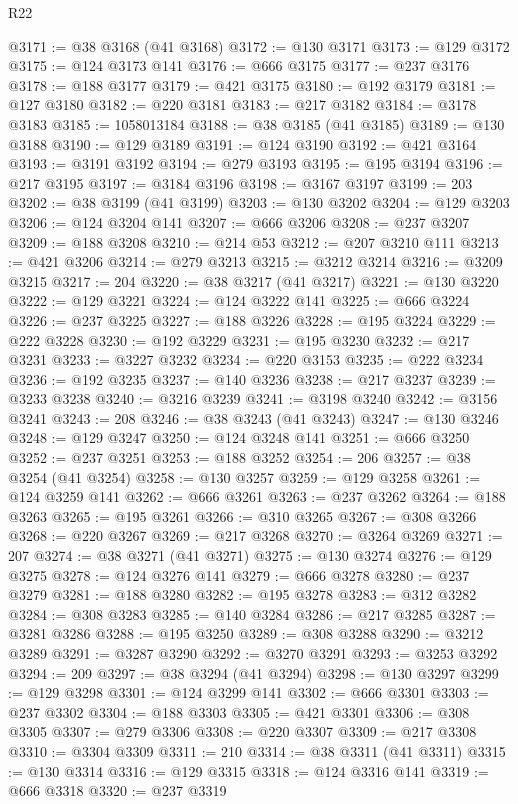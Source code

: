 \begin{lexlean}{R22}
\begin{coremodule}
@3171 := @38 @3168 (@41 @3168)
@3172 := @130 @3171
@3173 := @129 @3172
@3175 := @124 @3173 @141
@3176 := @666 @3175
@3177 := @237 @3176
@3178 := @188 @3177
@3179 := @421 @3175
@3180 := @192 @3179
@3181 := @127 @3180
@3182 := @220 @3181
@3183 := @217 @3182
@3184 := @3178 @3183
@3185 := 1058013184
@3188 := @38 @3185 (@41 @3185)
@3189 := @130 @3188
@3190 := @129 @3189
@3191 := @124 @3190
@3192 := @421 @3164
@3193 := @3191 @3192
@3194 := @279 @3193
@3195 := @195 @3194
@3196 := @217 @3195
@3197 := @3184 @3196
@3198 := @3167 @3197
@3199 := 203
@3202 := @38 @3199 (@41 @3199)
@3203 := @130 @3202
@3204 := @129 @3203
@3206 := @124 @3204 @141
@3207 := @666 @3206
@3208 := @237 @3207
@3209 := @188 @3208
@3210 := @214 @53
@3212 := @207 @3210 @111
@3213 := @421 @3206
@3214 := @279 @3213
@3215 := @3212 @3214
@3216 := @3209 @3215
@3217 := 204
@3220 := @38 @3217 (@41 @3217)
@3221 := @130 @3220
@3222 := @129 @3221
@3224 := @124 @3222 @141
@3225 := @666 @3224
@3226 := @237 @3225
@3227 := @188 @3226
@3228 := @195 @3224
@3229 := @222 @3228
@3230 := @192 @3229
@3231 := @195 @3230
@3232 := @217 @3231
@3233 := @3227 @3232
@3234 := @220 @3153
@3235 := @222 @3234
@3236 := @192 @3235
@3237 := @140 @3236
@3238 := @217 @3237
@3239 := @3233 @3238
@3240 := @3216 @3239
@3241 := @3198 @3240
@3242 := @3156 @3241
@3243 := 208
@3246 := @38 @3243 (@41 @3243)
@3247 := @130 @3246
@3248 := @129 @3247
@3250 := @124 @3248 @141
@3251 := @666 @3250
@3252 := @237 @3251
@3253 := @188 @3252
@3254 := 206
@3257 := @38 @3254 (@41 @3254)
@3258 := @130 @3257
@3259 := @129 @3258
@3261 := @124 @3259 @141
@3262 := @666 @3261
@3263 := @237 @3262
@3264 := @188 @3263
@3265 := @195 @3261
@3266 := @310 @3265
@3267 := @308 @3266
@3268 := @220 @3267
@3269 := @217 @3268
@3270 := @3264 @3269
@3271 := 207
@3274 := @38 @3271 (@41 @3271)
@3275 := @130 @3274
@3276 := @129 @3275
@3278 := @124 @3276 @141
@3279 := @666 @3278
@3280 := @237 @3279
@3281 := @188 @3280
@3282 := @195 @3278
@3283 := @312 @3282
@3284 := @308 @3283
@3285 := @140 @3284
@3286 := @217 @3285
@3287 := @3281 @3286
@3288 := @195 @3250
@3289 := @308 @3288
@3290 := @3212 @3289
@3291 := @3287 @3290
@3292 := @3270 @3291
@3293 := @3253 @3292
@3294 := 209
@3297 := @38 @3294 (@41 @3294)
@3298 := @130 @3297
@3299 := @129 @3298
@3301 := @124 @3299 @141
@3302 := @666 @3301
@3303 := @237 @3302
@3304 := @188 @3303
@3305 := @421 @3301
@3306 := @308 @3305
@3307 := @279 @3306
@3308 := @220 @3307
@3309 := @217 @3308
@3310 := @3304 @3309
@3311 := 210
@3314 := @38 @3311 (@41 @3311)
@3315 := @130 @3314
@3316 := @129 @3315
@3318 := @124 @3316 @141
@3319 := @666 @3318
@3320 := @237 @3319

\end{coremodule}
\end{lexlean}
